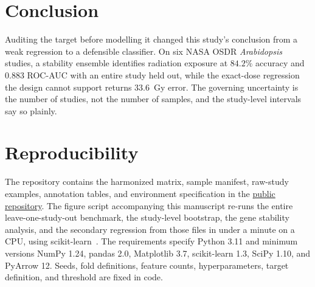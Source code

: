 \documentclass[manuscript,nonacm]{acmart}
\begin{document}
\section{Conclusion}
Auditing the target before modelling it changed this study's conclusion from a weak
regression to a defensible classifier. On six NASA OSDR \emph{Arabidopsis} studies, a
stability ensemble identifies radiation exposure at $84.2\%$ accuracy and $0.883$ ROC-AUC
with an entire study held out, while the exact-dose regression the design cannot support
returns $33.6$~Gy error. The governing uncertainty is the number of studies, not the
number of samples, and the study-level intervals say so plainly.

\section*{Reproducibility}
The repository contains the harmonized matrix, sample manifest, raw-study examples,
annotation tables, and environment specification in the
\href{https://github.com/guptaishaan/research-projects/tree/icaise-2026-format/raddose-phytodosimetry}{public repository}.
The figure script accompanying this manuscript
re-runs the entire leave-one-study-out benchmark, the study-level bootstrap, the gene
stability analysis, and the secondary regression from those files in under a minute on a
CPU, using scikit-learn~\cite{pedregosa2011}. The requirements specify Python 3.11 and
minimum versions NumPy 1.24, pandas 2.0, Matplotlib 3.7, scikit-learn 1.3, SciPy 1.10,
and PyArrow 12. Seeds, fold definitions, feature counts, hyperparameters, target
definition, and threshold are fixed in code.



\end{document}
